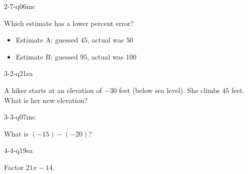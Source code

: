 \begin{practiceQuestion}{2-7-q06}{mc}
\begin{questionText}
Which estimate has a lower percent error?
\begin{itemize}
    \item Estimate A: guessed $45$, actual was $50$
    \item Estimate B: guessed $95$, actual was $100$
\end{itemize}
\end{questionText}
\end{practiceQuestion}

\begin{practiceQuestion}{3-2-q21}{sa}
\begin{questionText}
A hiker starts at an elevation of $-30$ feet (below sea level). She climbs $45$ feet. What is her new elevation?
\end{questionText}
\end{practiceQuestion}

\begin{practiceQuestion}{3-3-q07}{mc}
\begin{questionText}
What is $(-15) - (-20)$?
\end{questionText}
\end{practiceQuestion}

\begin{practiceQuestion}{4-4-q19}{sa}
\begin{questionText}
Factor $21x - 14$.
\end{questionText}
\end{practiceQuestion}

